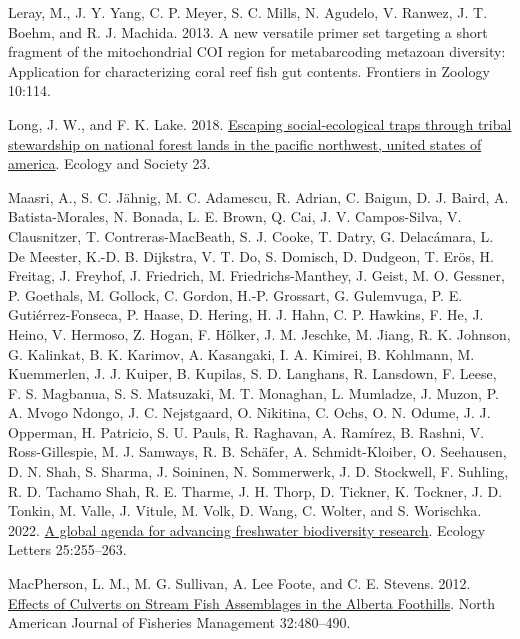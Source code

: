 \documentclass[
]{article}
\newlength{\cslhangindent}
\newlength{\cslentryspacingunit} %
\newenvironment{CSLReferences}[2] %
 {%
  \setlength{\parindent}{0pt}
  \ifodd #1
  \let\oldpar\par
  \def\par{\hangindent=\cslhangindent\oldpar}
  \fi
  \setlength{\parskip}{#2\cslentryspacingunit}
 }%
 {}
\begin{document}
\begin{CSLReferences}{1}{0}
\leavevmode{}%
Leray, M., J. Y. Yang, C. P. Meyer, S. C. Mills, N. Agudelo, V. Ranwez,
J. T. Boehm, and R. J. Machida. 2013. A new versatile primer set
targeting a short fragment of the mitochondrial COI region for
metabarcoding metazoan diversity: Application for characterizing coral
reef fish gut contents. Frontiers in Zoology 10:114.

\leavevmode{}%
Long, J. W., and F. K. Lake. 2018.
\href{https://www.jstor.org/stable/26799109}{Escaping social-ecological
traps through tribal stewardship on national forest lands in the pacific
northwest, united states of america}. Ecology and Society 23.

\leavevmode{}%
Maasri, A., S. C. Jähnig, M. C. Adamescu, R. Adrian, C. Baigun, D. J.
Baird, A. Batista-Morales, N. Bonada, L. E. Brown, Q. Cai, J. V.
Campos-Silva, V. Clausnitzer, T. Contreras-MacBeath, S. J. Cooke, T.
Datry, G. Delacámara, L. De Meester, K.-D. B. Dijkstra, V. T. Do, S.
Domisch, D. Dudgeon, T. Erös, H. Freitag, J. Freyhof, J. Friedrich, M.
Friedrichs-Manthey, J. Geist, M. O. Gessner, P. Goethals, M. Gollock, C.
Gordon, H.-P. Grossart, G. Gulemvuga, P. E. Gutiérrez-Fonseca, P. Haase,
D. Hering, H. J. Hahn, C. P. Hawkins, F. He, J. Heino, V. Hermoso, Z.
Hogan, F. Hölker, J. M. Jeschke, M. Jiang, R. K. Johnson, G. Kalinkat,
B. K. Karimov, A. Kasangaki, I. A. Kimirei, B. Kohlmann, M. Kuemmerlen,
J. J. Kuiper, B. Kupilas, S. D. Langhans, R. Lansdown, F. Leese, F. S.
Magbanua, S. S. Matsuzaki, M. T. Monaghan, L. Mumladze, J. Muzon, P. A.
Mvogo Ndongo, J. C. Nejstgaard, O. Nikitina, C. Ochs, O. N. Odume, J. J.
Opperman, H. Patricio, S. U. Pauls, R. Raghavan, A. Ramírez, B. Rashni,
V. Ross-Gillespie, M. J. Samways, R. B. Schäfer, A. Schmidt-Kloiber, O.
Seehausen, D. N. Shah, S. Sharma, J. Soininen, N. Sommerwerk, J. D.
Stockwell, F. Suhling, R. D. Tachamo Shah, R. E. Tharme, J. H. Thorp, D.
Tickner, K. Tockner, J. D. Tonkin, M. Valle, J. Vitule, M. Volk, D.
Wang, C. Wolter, and S. Worischka. 2022.
\href{https://doi.org/10.1111/ele.13931}{A global agenda for advancing
freshwater biodiversity research}. Ecology Letters 25:255--263.

\leavevmode{}%
MacPherson, L. M., M. G. Sullivan, A. Lee Foote, and C. E. Stevens.
2012. \href{https://doi.org/10.1080/02755947.2012.686004}{Effects of
Culverts on Stream Fish Assemblages in the Alberta Foothills}. North
American Journal of Fisheries Management 32:480--490.


\end{CSLReferences}
\end{document}
